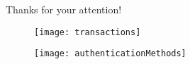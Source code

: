 \begin{frame}[c]
 
\begin{center}
  \Huge Thanks for your attention!
\end{center}
 
\end{frame}


\appendix
\backupbegin
\begin{frame}

  \begin{figure}
   \centering
   \texttt{[image: transactions]}
  \end{figure}


\end{frame}


\begin{frame}
 
 \begin{figure}
  \centering
  \texttt{[image: authenticationMethods]}
 \end{figure}

\end{frame}


\backupend
